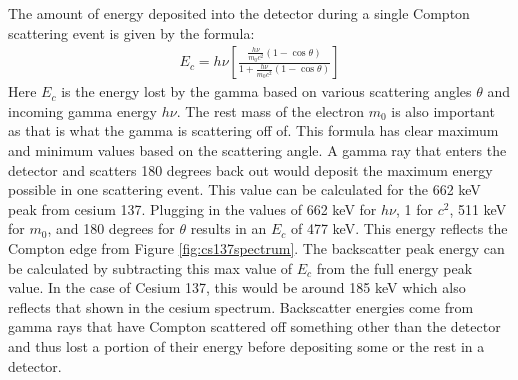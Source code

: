 The amount of energy deposited into the detector during a single Compton scattering event is given by the formula:
\begin{align}
  E_c=h\nu \left[ \frac{ \frac{h\nu}{m_0c^2}(1-\cos \theta ) }{1+\frac{h\nu}{m_0c^2}(1-\cos \theta )} \right]
\end{align}
Here $E_c$ is the energy lost by the gamma based on various scattering angles $\theta$ and incoming gamma energy $h\nu$.
The rest mass of the electron $m_0$ is also important as that is what the gamma is scattering off of.
This formula has clear maximum and minimum values based on the scattering angle.
A gamma ray that enters the detector and scatters 180 degrees back out would deposit the maximum energy possible in one scattering event.
This value can be calculated for the 662 keV peak from cesium 137.
Plugging in the values of 662 keV for $h\nu$, 1 for $c^2$, 511 keV for $m_0$, and 180 degrees for $\theta$ results in an $E_c$ of 477 keV.
This energy reflects the Compton edge from Figure \ref{fig:cs137spectrum}.
The backscatter peak energy can be calculated by subtracting this max value of $E_c$ from the full energy peak value.
In the case of Cesium 137, this would be around 185 keV which also reflects that shown in the cesium spectrum.
Backscatter energies come from gamma rays that have Compton scattered off something other than the detector and thus lost a portion of their energy before depositing some or the rest in a detector.

